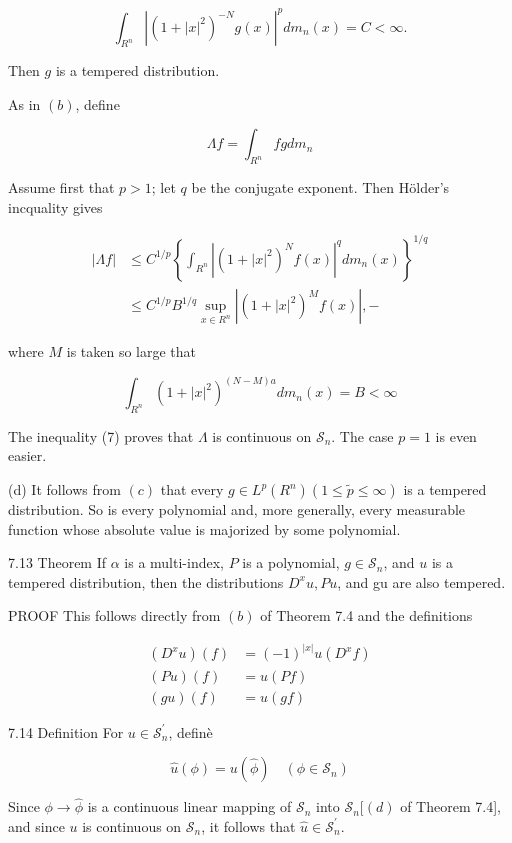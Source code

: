 \documentclass[10pt]{article}
\begin{document}
$$
\int_{R^{n}}\left|\left(1+|x|^{2}\right)^{-N} g(x)\right|^{p} d m_{n}(x)=C<\infty .
$$

Then $g$ is a tempered distribution.

As in $(b)$, define

$$
\Lambda f=\int_{R^{n}} f g d m_{n}
$$

Assume first that $p>1$; let $q$ be the conjugate exponent. Then Hölder's incquality gives

$$
\begin{aligned}
|\Lambda f| & \leq C^{1 / p}\left\{\int_{R^{n}}\left|\left(1+|x|^{2}\right)^{N} f(x)\right|^{q} d m_{n}(x)\right\}^{1 / q} \\
& \leq C^{1 / p} B^{1 / q} \sup _{x \in R^{n}}\left|\left(1+|x|^{2}\right)^{M} f(x)\right|,-
\end{aligned}
$$

where $M$ is taken so large that

$$
\int_{R^{n}}\left(1+|x|^{2}\right)^{(N-M) a} d m_{n}(x)=B<\infty
$$

The inequality (7) proves that $\Lambda$ is continuous on $\mathscr{S}_{n}$. The case $p=1$ is even easier.

(d) It follows from $(c)$ that every $g \in L^{p}\left(R^{n}\right)(1 \leq \tilde{p} \leq \infty)$ is a tempered distribution. So is every polynomial and, more generally, every measurable function whose absolute value is majorized by some polynomial.

7.13 Theorem If $\alpha$ is a multi-index, $P$ is a polynomial, $g \in \mathscr{S}_{n}$, and $u$ is a tempered distribution, then the distributions $D^{x} u, P u$, and gu are also tempered.

PROOF This follows directly from $(b)$ of Theorem 7.4 and the definitions

$$
\begin{aligned}
\left(D^{x} u\right)(f) & =(-1)^{|x|} u\left(D^{x} f\right) \\
(P u)(f) & =u(P f) \\
(g u)(f) & =u(g f)
\end{aligned}
$$

7.14 Definition For $u \in \mathscr{S}_{n}^{\prime}$, definè

$$
\hat{u}(\phi)=u(\hat{\phi}) \quad\left(\phi \in \mathscr{S}_{n}\right)
$$

Since $\phi \rightarrow \hat{\phi}$ is a continuous linear mapping of $\mathscr{S}_{n}$ into $\mathscr{S}_{n}[(d)$ of Theorem 7.4], and since $u$ is continuous on $\mathscr{S}_{n}$, it follows that $\hat{u} \in \mathscr{S}_{n}^{\prime}$.
\end{document}
